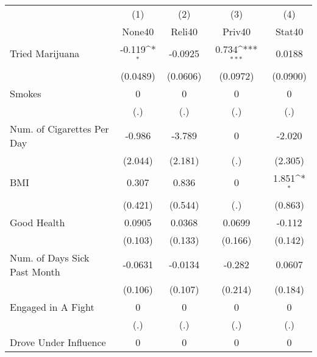 {
\def\sym#1{\ifmmode^{#1}\else\(^{#1}\)\fi}
\begin{tabular}{l*{4}{c}}
\hline\hline
            &\multicolumn{1}{c}{(1)}&\multicolumn{1}{c}{(2)}&\multicolumn{1}{c}{(3)}&\multicolumn{1}{c}{(4)}\\
            &\multicolumn{1}{c}{None40}&\multicolumn{1}{c}{Reli40}&\multicolumn{1}{c}{Priv40}&\multicolumn{1}{c}{Stat40}\\
\hline
Tried Marijuana&      -0.119\sym{*}  &     -0.0925         &       0.734\sym{***}&      0.0188         \\
            &    (0.0489)         &    (0.0606)         &    (0.0972)         &    (0.0900)         \\
[1em]
Smokes      &           0         &           0         &           0         &           0         \\
            &         (.)         &         (.)         &         (.)         &         (.)         \\
[1em]
Num. of Cigarettes Per Day&      -0.986         &      -3.789         &           0         &      -2.020         \\
            &     (2.044)         &     (2.181)         &         (.)         &     (2.305)         \\
[1em]
BMI         &       0.307         &       0.836         &           0         &       1.851\sym{*}  \\
            &     (0.421)         &     (0.544)         &         (.)         &     (0.863)         \\
[1em]
Good Health &      0.0905         &      0.0368         &      0.0699         &      -0.112         \\
            &     (0.103)         &     (0.133)         &     (0.166)         &     (0.142)         \\
[1em]
Num. of Days Sick Past Month&     -0.0631         &     -0.0134         &      -0.282         &      0.0607         \\
            &     (0.106)         &     (0.107)         &     (0.214)         &     (0.184)         \\
[1em]
Engaged in A Fight&           0         &           0         &           0         &           0         \\
            &         (.)         &         (.)         &         (.)         &         (.)         \\
[1em]
Drove Under Influence&           0         &           0         &           0         &           0         \\

\end{tabular}}

